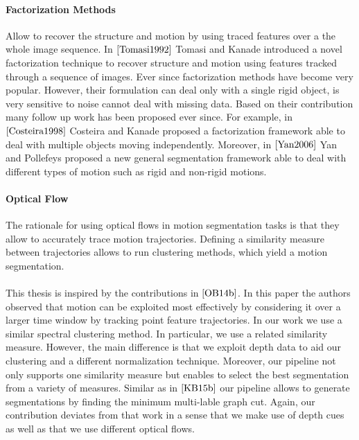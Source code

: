 \paragraph{Factorization Methods} Allow to recover the structure and motion by using traced features over a the whole image sequence. In $\cite{Tomasi1992}$ Tomasi and Kanade introduced a novel factorization technique to recover structure and motion using features tracked through a sequence of images. Ever since factorization methods have become very popular. However, their formulation can deal only with a single rigid object, is very sensitive to noise cannot deal with missing data. Based on their contribution many follow up work has been proposed ever since. For example, in $\cite{Costeira1998}$ Costeira and Kanade proposed a factorization framework able to deal with multiple objects moving independently. Moreover, in $\cite{Yan2006}$ Yan and Pollefeys proposed a new general segmentation framework able to deal with different types of motion such as rigid and non-rigid motions. 

\paragraph{Optical Flow}
The rationale for using optical flows in motion segmentation tasks is that they allow to accurately trace motion trajectories. Defining a similarity measure between trajectories allows to run clustering methods, which yield a motion segmentation. \\ \\
This thesis is inspired by the contributions in $\cite{OB14b}$. In this paper the authors observed that motion can be exploited most effectively by considering it over a larger time window by tracking point feature trajectories. In our work we use a similar spectral clustering method. In particular, we use a related similarity measure. However, the main difference is that we exploit depth data to aid our clustering and a different normalization technique. Moreover, our pipeline not only supports one similarity measure but enables to select the best segmentation from a variety of measures. Similar as in $\cite{KB15b}$ our pipeline allows to generate segmentations by finding the minimum multi-lable graph cut. Again, our contribution deviates from that work in a sense that we make use of depth cues as well as that we use different optical flows.

